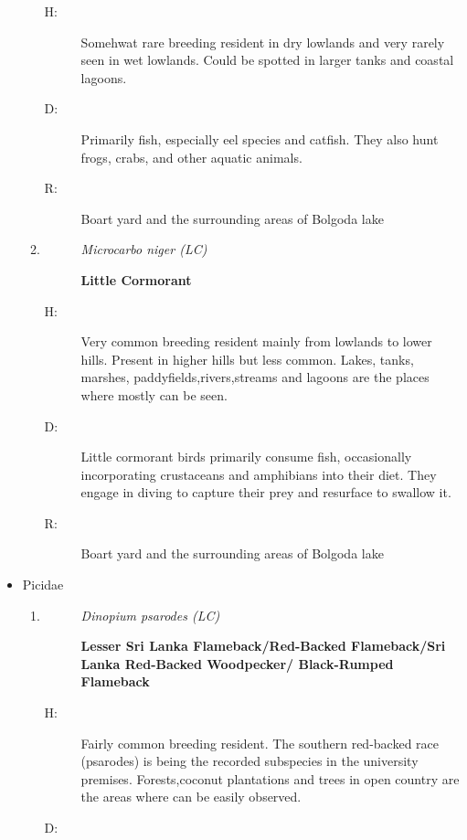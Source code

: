 \begin{itemize}
\begin{enumerate}
\begin{description}%
\item[H: ]%
Somehwat rare breeding resident in dry lowlands and very rarely seen in wet lowlands. Could be spotted in larger tanks and coastal lagoons.%
\item[D: ]%
Primarily fish, especially eel species and catfish. They also hunt frogs, crabs, and other aquatic animals.%
\item[R: ]%
Boart yard and the surrounding areas of Bolgoda lake%
\end{description}%
\item%
\begin{description}%
\item[]%
\textit{Microcarbo niger (LC)}%
\item[]%
\textbf{Little Cormorant}%
\end{description}%
\begin{description}%
\item[H: ]%
Very common breeding resident mainly from lowlands to lower hills. Present in higher hills but less common. Lakes, tanks, marshes, paddyfields,rivers,streams and lagoons are the places where mostly can be seen.%
\item[D: ]%
Little cormorant birds primarily consume fish, occasionally incorporating crustaceans and amphibians into their diet. They engage in diving to capture their prey and resurface to swallow it.%
\item[R: ]%
Boart yard and the surrounding areas of Bolgoda lake%
\end{description}%
\end{enumerate}%
\item%
Picidae%
\begin{enumerate}%
\item%
\begin{description}%
\item[]%
\textit{Dinopium psarodes (LC)}%
\item[]%
\textbf{Lesser Sri Lanka Flameback/Red{-}Backed Flameback/Sri Lanka Red{-}Backed Woodpecker/ Black{-}Rumped Flameback}%
\end{description}%
\begin{description}%
\item[H: ]%
Fairly common breeding resident. The southern red{-}backed race (psarodes) is being the recorded subspecies in the university premises. Forests,coconut plantations and trees in open country are the areas where can be easily observed.%
\item[D: ]%

\end{description}
\end{enumerate}
\end{itemize}
